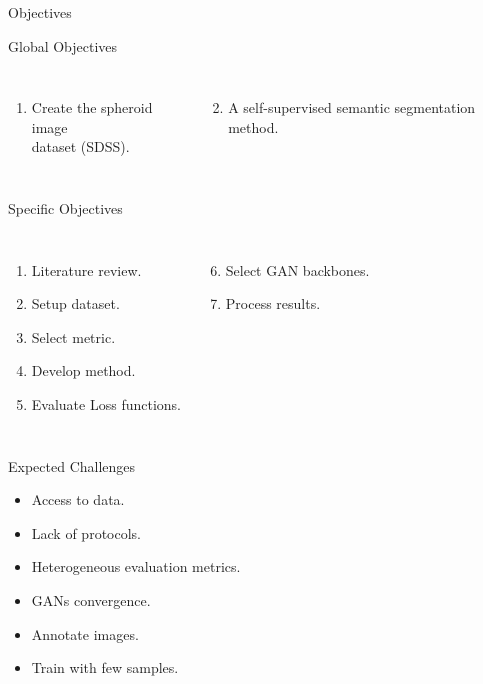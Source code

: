 \begin{frame}{Objectives}
            \begin{block}{Global Objectives}
                \begin{columns}
                \begin{enumerate}
                    \item Create the spheroid image\\ dataset (SDSS).
                \end{enumerate}
                \begin{enumerate}
                \setcounter{enumi}{1}
                    \item A self-supervised semantic segmentation method.
                \end{enumerate}
                \end{columns}
            \end{block}
            \begin{block}{Specific Objectives}
                \begin{columns}
                \begin{enumerate}
                    \item Literature review.
                    \item Setup dataset.
                    \item Select metric.
                    \item Develop method.
                    \item Evaluate Loss functions.
                \end{enumerate}
                \begin{enumerate}
                \setcounter{enumi}{5}
                    \item Select GAN backbones.
                    \item Process results.
                \end{enumerate}
                \end{columns}
            \end{block}
\end{frame}


\begin{frame}{Expected Challenges}
    \begin{itemize}
        \item Access to data.
        \item Lack of protocols.
        \item Heterogeneous evaluation metrics.
        \item GANs convergence.
        \item Annotate images.
        \item Train with few samples.
    \end{itemize}
\end{frame}

